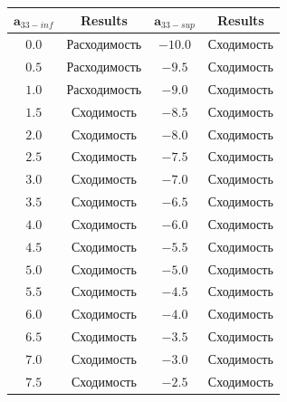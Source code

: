 \documentclass[../body.tex]{subfiles}
\begin{document}
\begin{table}[H]
			\centering
			\begin{tabular}{|c|c|c|c|}
				\hline
				$\textbf{a}_{33 - inf}$ & \textbf{Results} & $\textbf{a}_{33 - sup}$ & \textbf{Results}\\
				
				\hline
				$0.0$ & Расходимость & $-10.0$ & Сходимость \\
				
				\hline
				$0.5$ & Расходимость & $-9.5$ & Сходимость \\
				
				\hline
				$1.0$ & Расходимость & $-9.0$ & Сходимость \\
				
				\hline
				$1.5$ & Сходимость & $-8.5$ & Сходимость \\
				
				\hline
				$2.0$ & Сходимость & $-8.0$ & Сходимость \\
				
				\hline
				$2.5$ & Сходимость & $-7.5$ & Сходимость \\
				
				\hline
				$3.0$ & Сходимость & $-7.0$ & Сходимость \\
				
				\hline
				$3.5$ & Сходимость & $-6.5$ & Сходимость \\
				
				\hline
				$4.0$ & Сходимость & $-6.0$ & Сходимость \\
				
				\hline
				$4.5$ & Сходимость & $-5.5$ & Сходимость \\
				
				\hline
				$5.0$ & Сходимость & $-5.0$ & Сходимость\\
				
				\hline
				$5.5$ & Сходимость & $-4.5$ & Сходимость\\
				
				\hline
				$6.0$ & Сходимость & $-4.0$ & Сходимость \\
				
				\hline
				$6.5$ & Сходимость & $-3.5$ & Сходимость \\
				
				\hline
				$7.0$ & Сходимость & $-3.0$ & Сходимость \\
				
				\hline
				$7.5$ & Сходимость & $-2.5$ & Сходимость \\
				

\end{tabular}
\end{table}
\end{document}

